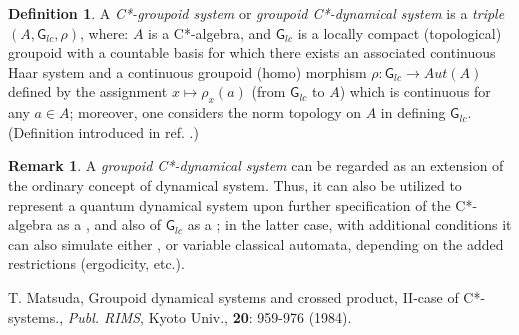 \documentclass[12pt]{article}
\theoremstyle{plain}
\theoremstyle{definition}
\newtheorem{definition}{Definition}[section]
\newtheorem{remark}{Remark}[section]
\numberwithin{equation}{section}
\newcommand{\grp}{{\mathsf{G}}}
\newcommand{\<}{{\langle}}
\begin{document}
\begin{definition}
A \emph{C*-groupoid system} or \emph{groupoid C*-dynamical system}
is a \emph{triple} $(A, \grp_{lc}, \rho )$, where:
$A$ is a C*-algebra, and $\grp_{lc}$ is a locally compact (topological) groupoid 
with a countable basis for which there exists an associated continuous Haar system and a continuous
groupoid (homo) morphism $\rho: \grp_{lc} \longrightarrow Aut(A)$ defined
by the assignment $x \mapsto \rho_x(a)$ (from $\grp_{lc}$ to $A$)
which is continuous for any $a \in A$; moreover, one considers the norm topology
on $A$ in defining $\grp_{lc}$. (Definition introduced in ref. \cite{MT1984}.)
\end{definition}

\begin{remark}
A \emph{groupoid C*-dynamical system} can be regarded as an extension of the ordinary concept
of dynamical system. Thus, it can also be utilized to represent a quantum dynamical system
upon further specification of the C*-algebra as a , and also of $\grp_{lc}$ as a ; in the latter case, with additional conditions it can also simulate either , or variable classical automata, depending on the added restrictions (ergodicity, etc.). 
\end{remark}

\begin{thebibliography}{9}
T. Matsuda, Groupoid dynamical systems and crossed product, II-case of C*-systems.,
\emph{Publ. RIMS}, Kyoto Univ., \textbf{20}: 959-976 (1984).

\end{thebibliography}
\end{document}
